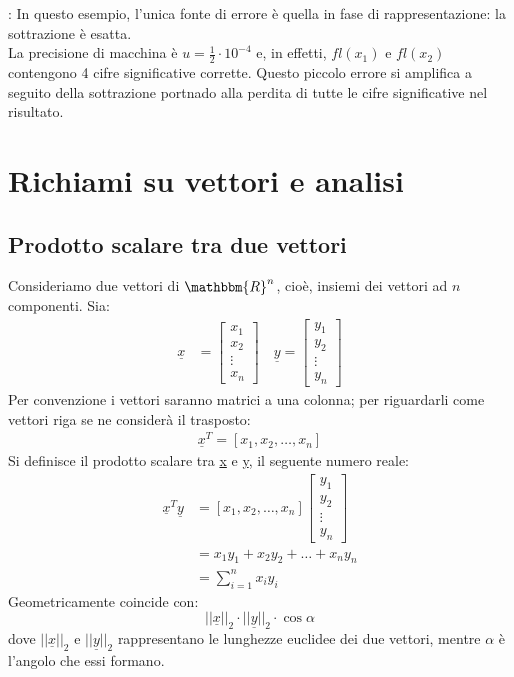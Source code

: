 \documentclass[12pt]{report}
\begin{document}
\begin{note}{}{}
:	In questo esempio, l'unica fonte di errore è quella in fase di rappresentazione: la sottrazione è esatta. \\
	La precisione di macchina è $u = \frac{1}{2} \cdot 10^{-4}$ e, in effetti, $fl(x_1)$ e $fl(x_2)$ contengono 4 cifre significative corrette. Questo piccolo errore si amplifica a seguito della sottrazione portnado alla perdita di tutte le cifre significative nel risultato.
\end{note}
\section{Richiami su vettori e analisi}
\subsection{Prodotto scalare tra due vettori}
Consideriamo due vettori di $\mathbbm{R}^n$, cioè, insiemi dei vettori ad $n$ componenti. Sia:
\begin{align*}
\underline{x} &= \begin{bmatrix}
	x_1 \\
	x_2 \\
	\vdots \\
	x_n
\end{bmatrix} \quad \underline{y} = \begin{bmatrix}
	y_1 \\
	y_2 \\
	\vdots \\
	y_n
\end{bmatrix}
\end{align*}
Per convenzione i vettori saranno matrici a una colonna; per riguardarli come vettori riga se ne considerà il trasposto:
\begin{align*}
	\underline{x}^T = [x_1, x_2, \dots, x_n]
\end{align*}
Si definisce il prodotto scalare tra \underline{x} e \underline{y}, il seguente numero reale:
\begin{align*}
\underline{x}^T\underline{y} &= [x_1, x_2, \dots, x_n]\begin{bmatrix}y_1 \\ y_2 \\ \vdots \\ y_n\end{bmatrix} \\
&= x_1y_1 + x_2y_2  + \dots + x_ny_n \\
&= \sum_{i=1}^{n}x_iy_i
\end{align*}
Geometricamente coincide con:
\[
||\underline{x}||_2 \cdot ||\underline{y}||_2 \cdot \cos\alpha
\]
dove $||\underline{x}||_2$ e $||\underline{y}||_2$ rappresentano le lunghezze euclidee dei due vettori, mentre $\alpha$ è l'angolo che essi formano.
\end{document}
